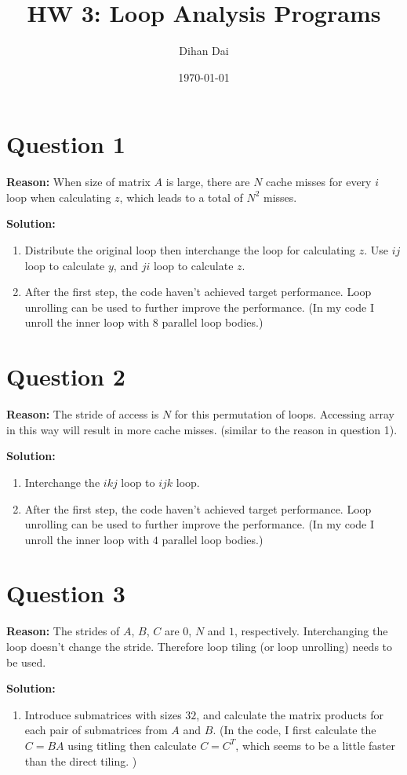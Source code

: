 \documentclass[11pt]{amsart}
\title{HW 3: Loop Analysis Programs}
\author{Dihan Dai}
\date{\today}
\begin{document}
\maketitle
\section*{Question 1}
\noindent\textbf{Reason:} When size of matrix $A$ is large, there are $N$ cache misses for every $i$ loop when calculating $z$, which leads to a total of $N^2$ misses.

\noindent\textbf{Solution: }
\begin{enumerate}[Step.1]
\item Distribute the original loop then interchange the loop for calculating $z$. Use $ij$ loop to calculate $y$, and $ji$ loop to calculate $z$.
\item After the first step, the code haven't achieved target performance. Loop unrolling can be used to further improve the performance. (In my code I unroll the inner loop with $8$ parallel loop bodies.) 
\end{enumerate}
\section*{Question 2}
\noindent\textbf{Reason: } The stride of access is $N$ for this permutation of loops. Accessing array in this way will result in more cache misses. (similar to the reason in question 1).

\noindent\textbf{Solution: }
\begin{enumerate}[Step.1]
  \item Interchange the $ikj$ loop to $ijk$ loop. 
  \item After the first step, the code haven't achieved target performance. Loop unrolling can be used to further improve the performance. (In my code I unroll the inner loop with $4$ parallel loop bodies.) 
\end{enumerate}
\section*{Question 3}
\noindent\textbf{Reason: } The strides of $A$, $B$, $C$ are $0$, $N$ and $1$, respectively. Interchanging the loop doesn't change the stride. Therefore loop tiling (or loop unrolling) needs to be used.

\noindent\textbf{Solution:}
\begin{enumerate}[Step.1]
  \item Introduce submatrices with sizes $32$, and calculate the matrix products for each pair of submatrices from $A$ and $B$. (In the code, I first calculate the $C = BA$ using titling then calculate $C = C^{T}$, which seems to be a little faster than the direct tiling. )
\end{enumerate}
\end{document}
